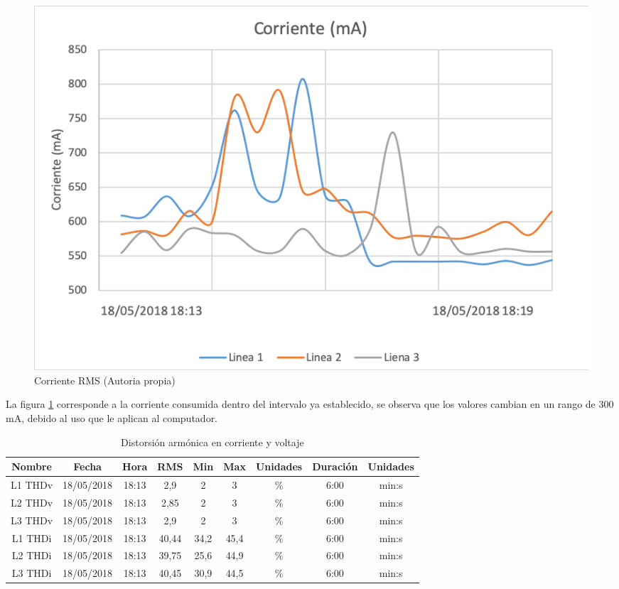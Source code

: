 \begin{figure}[H]
\centering
\includegraphics{2Marco/corriente-rms}
\caption{Corriente RMS (Autoria propia)} 
\label{fig:corriente-rms}
\end{figure} 

La figura \ref{fig:corriente-rms} corresponde a la corriente consumida dentro del intervalo ya establecido, se observa que los valores cambian en un rango de 300 mA, debido al uso que le aplican al computador.

\begin{table}[!htbp]
\begin{center}
\begin{tabular}{ |c|c|c|c|c|c|c|c|c| }
\hline
Nombre & Fecha & Hora & RMS & Min & Max & Unidades & Duración & Unidades\\
\hline
L1 THDv & 18/05/2018 & 18:13 & 2,9 & 2 & 3 & \% & 6:00 & min:s\\
\hline
L2 THDv & 18/05/2018 & 18:13 & 2,85 & 2 & 3 & \% & 6:00 & min:s\\
\hline
L3 THDv & 18/05/2018 & 18:13 & 2,9 & 2 & 3 & \% & 6:00 & min:s\\
\hline
L1 THDi & 18/05/2018 & 18:13 & 40,44 & 34,2 & 45,4 & \% & 6:00 & min:s\\
\hline
L2 THDi & 18/05/2018 & 18:13 & 39,75 & 25,6 & 44,9 & \% & 6:00 & min:s\\
\hline
L3 THDi & 18/05/2018 & 18:13 & 40,45 & 30,9 & 44,5 & \% & 6:00 & min:s\\
\hline
\end{tabular}
\end{center}
\caption{Distorsión armónica en corriente y voltaje}
\label{tab:distorsion-armonica}
\end{table}

